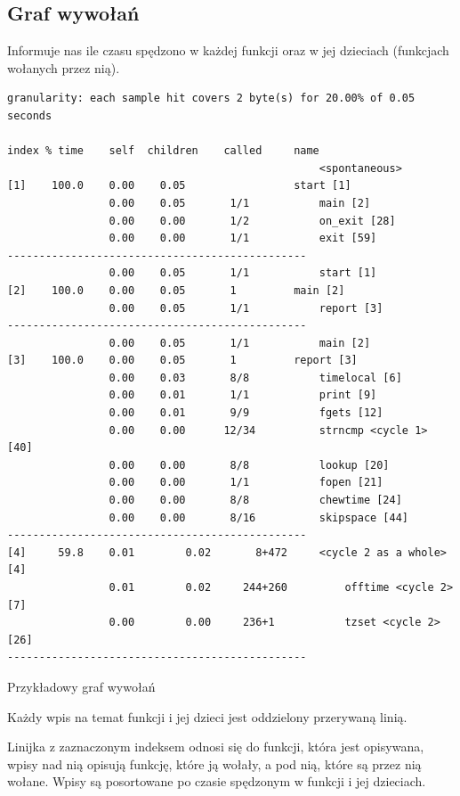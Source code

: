 \documentclass[shortabstract]{iithesis}
\theoremstyle{definition} \newtheorem*{definition}{Definicja}
\theoremstyle{definition} \newtheorem*{example}{Przykład}
\theoremstyle{definition} \newtheorem*{remark}{Uwaga}
\newenvironment{longlisting}{\captionsetup{type=listing}}{}
\begin{document}
\subsection{Graf wywołań}

Informuje nas ile czasu spędzono w każdej funkcji oraz w jej dzieciach (funkcjach wołanych przez nią).
\begin{longlisting}
  \begin{verbatim}
granularity: each sample hit covers 2 byte(s) for 20.00% of 0.05 seconds

index % time    self  children    called     name
                                                 <spontaneous>
[1]    100.0    0.00    0.05                 start [1]
                0.00    0.05       1/1           main [2]
                0.00    0.00       1/2           on_exit [28]
                0.00    0.00       1/1           exit [59]
-----------------------------------------------
                0.00    0.05       1/1           start [1]
[2]    100.0    0.00    0.05       1         main [2]
                0.00    0.05       1/1           report [3]
-----------------------------------------------
                0.00    0.05       1/1           main [2]
[3]    100.0    0.00    0.05       1         report [3]
                0.00    0.03       8/8           timelocal [6]
                0.00    0.01       1/1           print [9]
                0.00    0.01       9/9           fgets [12]
                0.00    0.00      12/34          strncmp <cycle 1> [40]
                0.00    0.00       8/8           lookup [20]
                0.00    0.00       1/1           fopen [21]
                0.00    0.00       8/8           chewtime [24]
                0.00    0.00       8/16          skipspace [44]
-----------------------------------------------
[4]     59.8    0.01        0.02       8+472     <cycle 2 as a whole>	[4]
                0.01        0.02     244+260         offtime <cycle 2> [7]
                0.00        0.00     236+1           tzset <cycle 2> [26]
-----------------------------------------------
  \end{verbatim}
  \caption{Przykładowy graf wywołań}
  \label{lst:graphcallprof}
\end{longlisting}

Każdy wpis na temat funkcji i jej dzieci jest oddzielony przerywaną linią.

Linijka z zaznaczonym indeksem odnosi się do funkcji, która jest opisywana, wpisy nad nią opisują funkcję, które ją wołały, a pod nią, które są przez nią wołane. Wpisy są posortowane po czasie spędzonym w funkcji i jej dzieciach.
\end{document}
